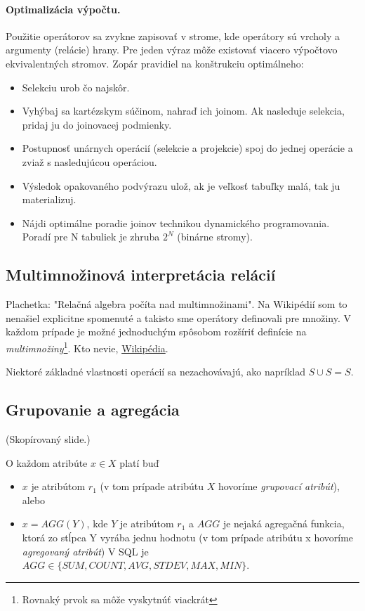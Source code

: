 \documentclass[10pt,a4paper]{article}
\begin{document}
\paragraph{Optimalizácia výpočtu.}
Použitie operátorov sa zvykne zapisovať v strome, kde operátory sú vrcholy a argumenty (relácie) hrany.
Pre jeden výraz môže existovať viacero výpočtovo ekvivalentných stromov.
Zopár pravidiel na konštrukciu optimálneho: 
\begin{itemize}
\item Selekciu urob čo najskôr.
\item Vyhýbaj sa kartézskym súčinom, nahraď ich joinom. Ak
nasleduje selekcia, pridaj ju do joinovacej podmienky.
\item Postupnosť unárnych operácií (selekcie a projekcie) spoj do
jednej operácie a zviaž s nasledujúcou operáciou.
\item Výsledok opakovaného podvýrazu ulož, ak je veľkosť tabuľky
malá, tak ju materializuj. 
\item Nájdi optimálne poradie joinov technikou dynamického
programovania. Poradí pre N tabuliek je zhruba $2^N$ (binárne stromy). 
\end{itemize}

\subsection{Multimnožinová interpretácia relácií}

Plachetka: "Relačná algebra počíta nad multimnožinami". Na Wikipédií som to nenašiel explicitne spomenuté a takisto sme operátory definovali pre množiny. V každom prípade je možné jednoduchým spôsobom rozšíriť definície na \emph{multimnožiny}\footnote{Rovnaký prvok sa môže vyskytnúť viackrát}. Kto nevie, \href{http://en.wikipedia.org/wiki/Multiset}{Wikipédia}. 

Niektoré základné vlastnosti operácií sa nezachovávajú, ako napríklad $S \cup S = S$. 

\subsection{Grupovanie a agregácia}
\label{rel_alg_agg}
(Skopírovaný slide.)

O každom atribúte $x \in X$ platí buď 
\begin{itemize}
\item $x$ je atribútom $r_1$ (v tom prípade atribútu $X$ hovoríme
        \emph{grupovací atribút}), alebo
\item $x = AGG(Y)$, kde $Y$ je atribútom $r_1$ a $AGG$ je nejaká
     agregačná funkcia, ktorá zo stĺpca Y vyrába jednu hodnotu (v
         tom prípade atribútu x hovoríme \emph{agregovaný atribút})
V SQL je $AGG \in \{SUM, COUNT, AVG, STDEV, MAX, MIN\}$.
\end{itemize}
\end{document}
